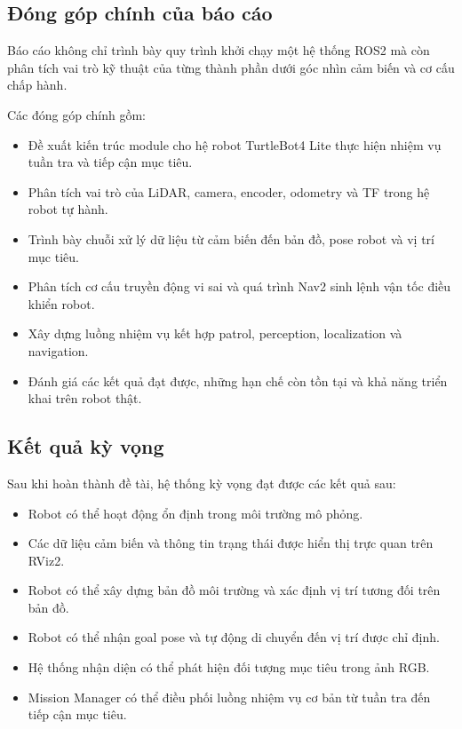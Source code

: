 \subsection{Đóng góp chính của báo cáo}

Báo cáo không chỉ trình bày quy trình khởi chạy một hệ thống ROS2 mà còn phân tích vai trò kỹ thuật của từng thành phần dưới góc nhìn cảm biến và cơ cấu chấp hành.

Các đóng góp chính gồm:

\begin{itemize}
    \item Đề xuất kiến trúc module cho hệ robot TurtleBot4 Lite thực hiện nhiệm vụ tuần tra và tiếp cận mục tiêu.
    
    \item Phân tích vai trò của LiDAR, camera, encoder, odometry và TF trong hệ robot tự hành.
    
    \item Trình bày chuỗi xử lý dữ liệu từ cảm biến đến bản đồ, pose robot và vị trí mục tiêu.
    
    \item Phân tích cơ cấu truyền động vi sai và quá trình Nav2 sinh lệnh vận tốc điều khiển robot.
    
    \item Xây dựng luồng nhiệm vụ kết hợp patrol, perception, localization và navigation.
    
    \item Đánh giá các kết quả đạt được, những hạn chế còn tồn tại và khả năng triển khai trên robot thật.
\end{itemize}

\subsection{Kết quả kỳ vọng}

Sau khi hoàn thành đề tài, hệ thống kỳ vọng đạt được các kết quả sau:

\begin{itemize}
    \item Robot có thể hoạt động ổn định trong môi trường mô phỏng.
    
    \item Các dữ liệu cảm biến và thông tin trạng thái được hiển thị trực quan trên RViz2.
    
    \item Robot có thể xây dựng bản đồ môi trường và xác định vị trí tương đối trên bản đồ.
    
    \item Robot có thể nhận goal pose và tự động di chuyển đến vị trí được chỉ định.
    
    \item Hệ thống nhận diện có thể phát hiện đối tượng mục tiêu trong ảnh RGB.
    
    \item Mission Manager có thể điều phối luồng nhiệm vụ cơ bản từ tuần tra đến tiếp cận mục tiêu.
\end{itemize}

